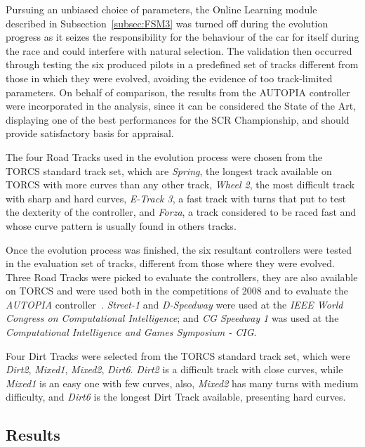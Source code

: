 	Pursuing an unbiased choice of parameters, the Online Learning module described in Subsection~\ref{subsec:FSM3} was turned off during the evolution progress as it seizes the responsibility for the behaviour of the car for itself during the race and could interfere with natural selection. The validation then occurred through testing the six produced pilots in a predefined set of tracks different from those in which they were evolved, avoiding the evidence of too track-limited parameters. On behalf of comparison, the results from the AUTOPIA controller were incorporated in the analysis, since it can be considered the State of the Art, displaying one of the best performances for the SCR Championship, and should provide satisfactory basis for appraisal.

	The four Road Tracks used in the evolution process were chosen from the TORCS standard track set, which are \emph{Spring}, the longest track available on TORCS with more curves than any other track, \emph{Wheel 2}, the most difficult track with sharp and hard curves, \emph{E-Track 3}, a fast track with turns that put to test the dexterity of the controller, and \emph{Forza}, a track considered to be raced fast and whose curve pattern is usually found in others tracks.
	
	Once the evolution process was finished, the six resultant controllers were tested in the evaluation set of tracks, different from those where they were evolved. Three Road Tracks were picked to evaluate the controllers, they are also available on TORCS and were used both in the competitions of 2008 and to evaluate the \emph{AUTOPIA} controller~\cite{AUTOPIA2009}. \emph{Street-1} and \emph{D-Speedway} were used at the \emph{IEEE World Congress on Computational Intelligence}; and \emph{CG Speedway 1} was used at the \emph{Computational Intelligence and Games Symposium - CIG}.

	Four Dirt Tracks were selected from the TORCS standard track set, which were \emph{Dirt2}, \emph{Mixed1}, \emph{Mixed2}, \emph{Dirt6}. \emph{Dirt2} is a difficult track with close curves, while \emph{Mixed1} is an easy one with few curves, also, \emph{Mixed2} has many turns with medium difficulty, and \emph{Dirt6} is the longest Dirt Track available, presenting hard curves.
	  
	
\subsection{Results} \label{subsec:Results}
	
